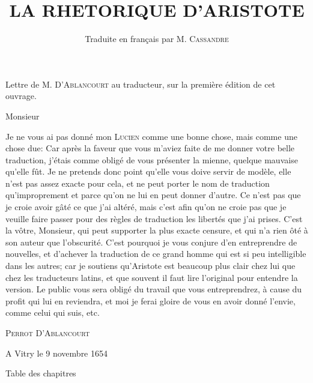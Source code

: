 \documentclass[11pt]{book}
\title{LA 
RHETORIQUE 
D'ARISTOTE}
\author{Traduite en français par M. \textsc{Cassandre}}
\begin{document}
\maketitle

Lettre de M. \textsc{D'Ablancourt} au traducteur, sur la première édition de cet ouvrage. 

Monsieur

Je ne vous ai pas donné mon \textsc{Lucien} comme une 
bonne chose, mais comme une chose due: Car après 
la faveur que vous m'aviez faite de me donner votre 
belle traduction, j'étais comme obligé de vous
présenter la mienne, quelque mauvaise qu'elle fût. Je ne 
pretends donc point qu'elle vous doive servir de modèle,
elle n'est pas assez exacte pour cela, et ne peut porter
le nom de traduction qu'improprement et parce 
qu'on ne lui en peut donner d'autre. Ce n'est pas que 
je croie avoir gâté ce que j'ai altéré, mais c'est afin 
qu'on ne croie pas que je veuille faire passer pour des 
règles de traduction les libertés que j'ai prises. C'est la 
vôtre, Monsieur, qui peut supporter la plus exacte censure, 
et qui n'a rien ôté à son auteur que l'obscurité. 
C'est pourquoi je vous conjure d'en entreprendre de 
nouvelles, et d'achever la traduction de ce grand 
homme qui est si peu intelligible dans les autres; car je 
soutiens qu'Aristote est beaucoup plus clair chez lui que 
chez les traducteurs latins, et que souvent il faut 
lire l'original pour entendre la version. Le public vous 
sera obligé du travail que vous entreprendrez, à cause 
du profit qui lui en reviendra, et moi je ferai gloire de 
vous en avoir donné l'envie, comme celui qui suis, etc.

\textsc{Perrot D'Ablancourt}

A Vitry le 9 novembre 1654


Table des chapitres



\end{document}
